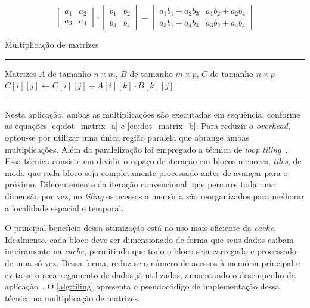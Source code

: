 \begin{equation}
	\label{eq:multi_matrix}
	\begin{bmatrix}
		a_1 & a_2 \\
		a_3 & a_4
	\end{bmatrix}
	\cdot
	\begin{bmatrix}
		b_1 & b_2 \\
		b_3 & b_4
	\end{bmatrix}
	=
	\begin{bmatrix}
		a_1b_1 + a_2b_3 & a_1b_2 + a_2b_4 \\
		a_3b_1 + a_4b_3 & a_3b_2 + a_4b_4
	\end{bmatrix}
\end{equation}

\begin{algorithm}[htb]
	\caption{Multiplicação de matrizes}
	\label{alg:mul_matrix}
	\hrule
	\begin{algorithmic}[1]
		\REQUIRE Matrizes $A$ de tamanho $n \times m$, $B$ de tamanho $m \times p$, $C$ de tamanho $n \times p$
		\STATE $C[i][j] \gets C[i][j] + A[i][k] \cdot B[k][j]$
		\ENDFOR
		\ENDFOR
		\ENDFOR
	\end{algorithmic}
	\hrule
\end{algorithm}

Nesta aplicação, ambas as multiplicações são executadas em sequência, conforme as equações \autoref{eq:dot_matrix_a} e \autoref{eq:dot_matrix_b}. Para reduzir o \textit{overhead}, optou-se por utilizar uma única região paralela que abrange ambas multiplicações. Além da paralelização foi empregado a técnica de \textit{loop tiling}~\cite{bakos2016}. Essa técnica consiste em dividir o espaço de iteração em blocos menores, \textit{tiles}, de modo que cada bloco seja completamente processado antes de avançar para o próximo. Diferentemente da iteração convencional, que percorre toda uma dimensão por vez, no \textit{tiling} os acessos a memória são reorganizados para melhorar a localidade espacial e temporal.

O principal benefício dessa otimização está no uso mais eficiente da \textit{cache}. Idealmente, cada bloco deve ser dimensionado de forma que seus dados caibam inteiramente na \textit{cache}, permitindo que todo o bloco seja carregado e processado de uma só vez. Dessa forma, reduz-se o número de acessos à memória principal e evita-se o recarregamento de dados já utilizados, aumentando o desempenho da aplicação~\cite{bakos2016}. O \autoref{alg:tiling} apresenta o pseudocódigo de implementação dessa técnica na multiplicação de matrizes.


